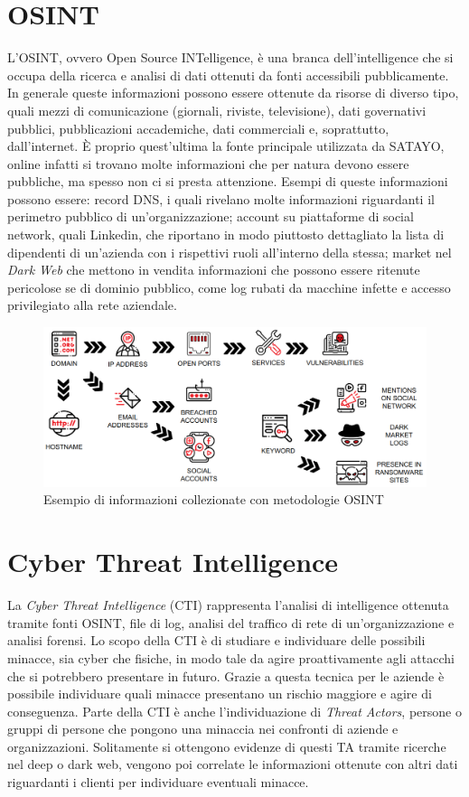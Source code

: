 \section{OSINT}
\label{sec:osint}

L'OSINT\cite{GLASSMAN2012673}, ovvero Open Source INTelligence, è una branca dell'intelligence
che si occupa della ricerca e analisi di dati ottenuti da fonti accessibili pubblicamente.
In generale queste informazioni possono essere ottenute da risorse di diverso
tipo, quali mezzi di comunicazione (giornali, riviste, televisione), dati
governativi pubblici, pubblicazioni accademiche, dati commerciali e, soprattutto,
dall'internet. È proprio quest'ultima la fonte principale utilizzata da SATAYO,
online infatti si trovano molte informazioni che per natura devono essere
pubbliche, ma spesso non ci si presta attenzione. Esempi di queste informazioni
possono essere: record DNS, i quali rivelano molte informazioni riguardanti il
perimetro pubblico di un'organizzazione; account su piattaforme di social network,
quali Linkedin, che riportano in modo piuttosto dettagliato la lista di dipendenti
di un'azienda con i rispettivi ruoli all'interno della stessa; market nel
\textit{Dark Web} che mettono in vendita informazioni che possono essere ritenute
pericolose se di dominio pubblico, come log rubati da macchine infette e accesso
privilegiato alla rete aziendale.

\begin{figure}[htbp]
  \centering
  \includegraphics[width=.7\linewidth]{images/exposure_assessment.png}
  \caption{Esempio di informazioni collezionate con metodologie OSINT\cite{pavanello-master}}
  \label{fig:exposure_assessment}
\end{figure}

\pagebreak
\section{Cyber Threat Intelligence}
\label{sec:cti}

La \textit{Cyber Threat Intelligence}\cite{lee2023cyber} (CTI) rappresenta l'analisi
di intelligence ottenuta tramite fonti OSINT, file di log, analisi del traffico
di rete di un'organizzazione e analisi forensi. Lo scopo della CTI è di studiare
e individuare delle possibili minacce, sia cyber che fisiche, in modo tale da agire
proattivamente agli attacchi che si potrebbero presentare in futuro. Grazie a
questa tecnica per le aziende è possibile individuare quali minacce presentano
un rischio maggiore e agire di conseguenza. Parte della CTI è anche l'individuazione
di \textit{Threat Actors}, persone o gruppi di persone che pongono una minaccia nei
confronti di aziende e organizzazioni. Solitamente si ottengono evidenze di
questi TA tramite ricerche nel deep o dark web, vengono poi correlate le informazioni
ottenute con altri dati riguardanti i clienti per individuare eventuali minacce.